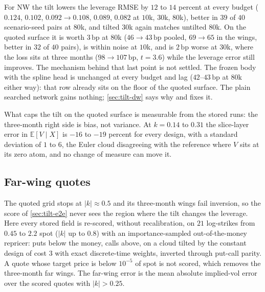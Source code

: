 \documentclass[11pt,a4paper]{article}
\newcommand{\E}{\mathbb{E}}
\newcommand{\bp}{\,\mathrm{bp}}
\begin{document}
For NW the tilt lowers the leverage RMSE by $12$ to $14$ percent at every budget ($0.124$, $0.102$, $0.092\to0.108$, $0.089$, $0.082$ at $10$k, $30$k, $80$k), better in $39$ of $40$ scenario-seed pairs at $80$k, and tilted $30$k again matches untilted $80$k. On the quoted surface it is worth $3\bp$ at $80$k ($46\to43\bp$ pooled, $69\to65$ in the wings, better in $32$ of $40$ pairs), is within noise at $10$k, and is $2\bp$ worse at $30$k, where the loss sits at three months ($98\to107\bp$, $t=3.6$) while the leverage error still improves. The mechanism behind that last point is not settled. The frozen body with the spline head is unchanged at every budget and lag ($42$--$43\bp$ at $80$k either way): that row already sits on the floor of the quoted surface. The plain searched network gains nothing; \cref{sec:tilt-dw} says why and fixes it.

What caps the tilt on the quoted surface is measurable from the stored runs: the three-month right side is bias, not variance. At $k=0.14$ to $0.31$ the slice-layer error in $\E[V\mid X]$ is $-16$ to $-19$ percent for every design, with a standard deviation of $1$ to $6$, the Euler cloud disagreeing with the reference where $V$ sits at its zero atom, and no change of measure can move it.

\subsection{Far-wing quotes}\label{sec:tilt-far}
The quoted grid stops at $|k|\approx0.5$ and its three-month wings fail inversion, so the score of \cref{sec:tilt-e2e} never sees the region where the tilt changes the leverage. Here every stored field is re-scored, without recalibration, on $21$ log-strikes from $0.45$ to $2.2$ spot ($|k|$ up to $0.8$) with an importance-sampled out-of-the-money repricer: puts below the money, calls above, on a cloud tilted by the constant design of cost $3$ with exact discrete-time weights, inverted through put-call parity. A quote whose target price is below $10^{-5}$ of spot is not scored, which removes the three-month far wings. The far-wing error is the mean absolute implied-vol error over the scored quotes with $|k|>0.25$.

\begin{table}[h]\centering\footnotesize
\caption{Far-wing implied-vol MAE in bp at the $80$k budget: pooled over maturities and at $0.5$, $1$ and $2$ years, the mean number of scored far-wing quotes, and the $13$-strike pooled MAE for reference. Every row is over the same $20$ SSVI scenarios and two seeds. Bold: smallest in each column over the non-floor rows.}\label{tab:tilt-far}

\end{table}
\end{document}
